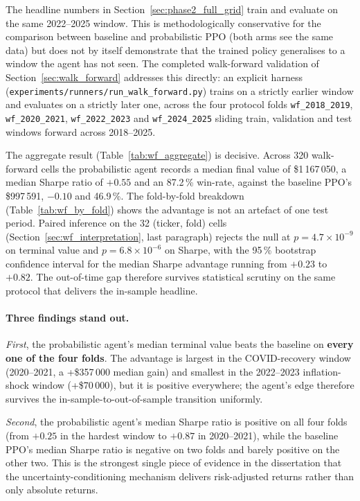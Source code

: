 The headline numbers in Section~\ref{sec:phase2_full_grid} train and evaluate on the same 2022--2025 window. This is methodologically conservative for the comparison between baseline and probabilistic PPO (both arms see the same data) but does not by itself demonstrate that the trained policy generalises to a window the agent has not seen. The completed walk-forward validation of Section~\ref{sec:walk_forward} addresses this directly: an explicit harness (\texttt{experiments/runners/run\_walk\_forward.py}) trains on a strictly earlier window and evaluates on a strictly later one, across the four protocol folds \texttt{wf\_2018\_2019}, \texttt{wf\_2020\_2021}, \texttt{wf\_2022\_2023} and \texttt{wf\_2024\_2025} sliding train, validation and test windows forward across 2018--2025.

The aggregate result (Table~\ref{tab:wf_aggregate}) is decisive. Across 320 walk-forward cells the probabilistic agent records a median final value of \$1\,167\,050, a median Sharpe ratio of $+0.55$ and an 87.2\,\% win-rate, against the baseline PPO's \$997\,591, $-0.10$ and 46.9\,\%. The fold-by-fold breakdown (Table~\ref{tab:wf_by_fold}) shows the advantage is not an artefact of one test period. Paired inference on the 32 (ticker, fold) cells (Section~\ref{sec:wf_interpretation}, last paragraph) rejects the null at $p = 4.7 \times 10^{-9}$ on terminal value and $p = 6.8 \times 10^{-6}$ on Sharpe, with the 95\,\% bootstrap confidence interval for the median Sharpe advantage running from $+0.23$ to $+0.82$. The out-of-time gap therefore survives statistical scrutiny on the same protocol that delivers the in-sample headline.

\paragraph{Three findings stand out.} \textit{First}, the probabilistic agent's median terminal value beats the baseline on \textbf{every one of the four folds}. The advantage is largest in the COVID-recovery window (2020--2021, a +\$357\,000 median gain) and smallest in the 2022--2023 inflation-shock window (+\$70\,000), but it is positive everywhere; the agent's edge therefore survives the in-sample-to-out-of-sample transition uniformly.

\textit{Second}, the probabilistic agent's median Sharpe ratio is positive on all four folds (from $+0.25$ in the hardest window to $+0.87$ in 2020--2021), while the baseline PPO's median Sharpe ratio is negative on two folds and barely positive on the other two. This is the strongest single piece of evidence in the dissertation that the uncertainty-conditioning mechanism delivers risk-adjusted returns rather than only absolute returns.

